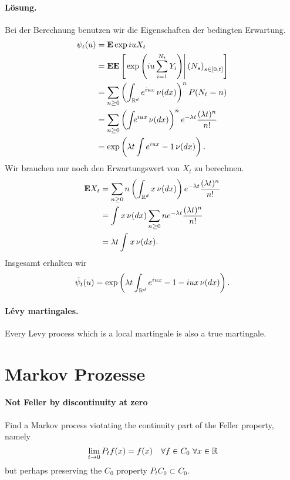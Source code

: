 \paragraph*{Lösung.} Bei der Berechnung benutzen wir die Eigenschaften der bedingten
Erwartung.
\begin{align*}
    \psi_t (u) &= \mathbf{E} \exp iu X_t \\
    &= \mathbf{E} \mathbf{E} \left[ \left. \exp \left( iu \sum_{i=1}^{N_t} Y_i \right) \right| \left( N_s \right)_{s\in [0,t]} \right] \\
    &= \sum_{n \geq 0}^{} \left( \int_{\mathbb R^d} e^{iu x} \, \nu(dx) \right)^n P(N_t = n) \\
    &= \sum_{n \geq 0}^{} \left( \int_{} e^{iu x} \, \nu(dx) \right)^n
        e^{-\lambda t} \frac{(\lambda t)^n}{n!} \\
    &= \exp \left( \lambda t \int e^{iux}-1 \, \nu(dx) \right).
\end{align*}
Wir brauchen nur noch den Erwartungswert von $X_t$ zu berechnen. 
\begin{align*}
    \mathbf{E} X_t &= \sum_{n \geq 0}^{} n \left( \int_{\mathbb R^d} x\, \nu(dx) \right) 
    e^{-\lambda t} \frac{(\lambda t)^n}{n!} \\
    &= \int_{}^{} x \, \nu(dx) \sum_{n \geq 0} n e^{-\lambda t} \frac{(\lambda t)^n}{n!} \\
    &= \lambda t \int_{}^{} x \, \nu (dx). 
\end{align*}
Insgesamt erhalten wir 
\begin{equation*}
    \tilde \psi_t (u) = \exp \left( \lambda t \int_{\mathbb R^d} e^{iux}-1-iux \, \nu(dx) \right).
\end{equation*}





\paragraph{L\'evy martingales.} Every Levy process which is a local martingale is
also a true martingale.



\section{Markov Prozesse}

\paragraph{Not Feller by discontinuity at zero}
Find a Markov process viotating the continuity part of 
the Feller property, namely
\begin{equation}
\lim_{t\to 0} P_t f(x) = f(x) \quad \forall f \in C_0 \ \forall x\in \mathbb R
\end{equation}
but perhaps preserving the $C_0$ property $P_t C_0 \subset C_0$.



